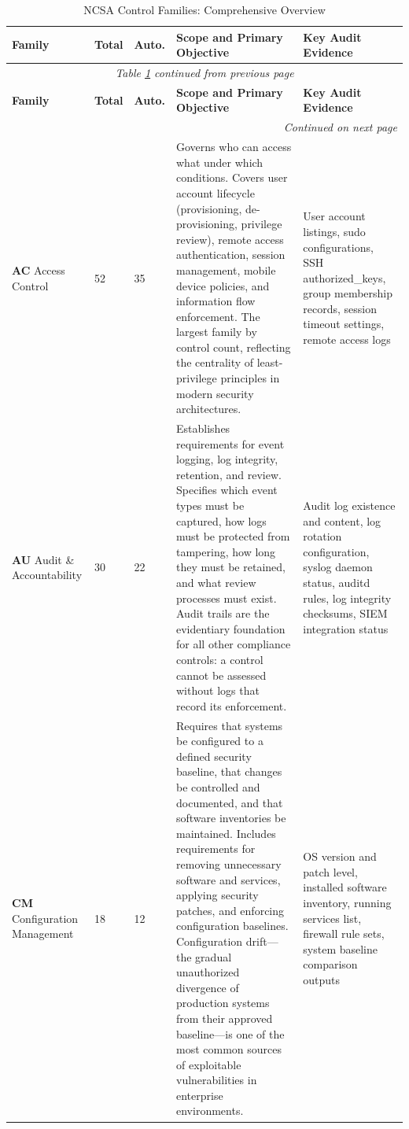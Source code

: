 \documentclass[12pt,oneside]{report}
\begin{document}
\renewcommand{\arraystretch}{1.2}
\scriptsize
\begin{longtable}{|p{3.2cm}|p{0.8cm}|p{0.8cm}|p{6.8cm}|p{3.2cm}|}
\caption{NCSA Control Families: Comprehensive Overview}
\label{tab:ncsa_families} \\
\hline
\textbf{Family} & \textbf{Total} & \textbf{Auto.} & \textbf{Scope and Primary Objective} & \textbf{Key Audit Evidence} \\
\hline
\endfirsthead
\multicolumn{5}{c}{\textit{Table \ref{tab:ncsa_families} continued from previous page}} \\
\hline
\textbf{Family} & \textbf{Total} & \textbf{Auto.} & \textbf{Scope and Primary Objective} & \textbf{Key Audit Evidence} \\
\hline
\endhead
\hline
\multicolumn{5}{r}{\textit{Continued on next page}} \\
\endfoot
\hline
\endlastfoot
\textbf{AC} Access Control & 52 & 35 & Governs who can access what under which conditions. Covers user account lifecycle (provisioning, de-provisioning, privilege review), remote access authentication, session management, mobile device policies, and information flow enforcement. The largest family by control count, reflecting the centrality of least-privilege principles in modern security architectures. & User account listings, sudo configurations, SSH authorized\_keys, group membership records, session timeout settings, remote access logs \\
\hline
\textbf{AU} Audit \& Accountability & 30 & 22 & Establishes requirements for event logging, log integrity, retention, and review. Specifies which event types must be captured, how logs must be protected from tampering, how long they must be retained, and what review processes must exist. Audit trails are the evidentiary foundation for all other compliance controls: a control cannot be assessed without logs that record its enforcement. & Audit log existence and content, log rotation configuration, syslog daemon status, auditd rules, log integrity checksums, SIEM integration status \\
\hline
\textbf{CM} Configuration Management & 18 & 12 & Requires that systems be configured to a defined security baseline, that changes be controlled and documented, and that software inventories be maintained. Includes requirements for removing unnecessary software and services, applying security patches, and enforcing configuration baselines. Configuration drift—the gradual unauthorized divergence of production systems from their approved baseline—is one of the most common sources of exploitable vulnerabilities in enterprise environments. & OS version and patch level, installed software inventory, running services list, firewall rule sets, system baseline comparison outputs \\

\end{longtable}
\end{document}
